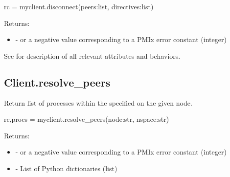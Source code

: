 \pyspecificstart
\begin{codepar}
rc = myclient.disconnect(peers:list, directives:list)
\end{codepar}
\pyspecificend

\begin{arglist}
\end{arglist}

Returns:

\begin{itemize}
    \item {} -  or a negative value corresponding to a PMIx error constant (integer)
\end{itemize}

See  for description of all relevant attributes and behaviors.


\subsection{Client.resolve_peers}

\summary

Return list of processes within the specified  on the given node.

\format

\pyspecificstart
\begin{codepar}
rc,procs = myclient.resolve_peers(node:str, nspace:str)
\end{codepar}
\pyspecificend

\begin{arglist}
\end{arglist}

Returns:

\begin{itemize}
    \item {} -  or a negative value corresponding to a PMIx error constant (integer)
    \item {} - List of Python  dictionaries (list)
\end{itemize}

